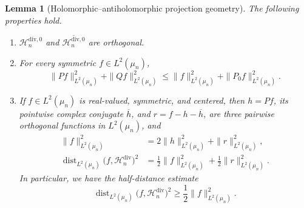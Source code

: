 \documentclass[11pt,reqno]{amsart}
\numberwithin{equation}{section}%
\numberwithin{figure}{section}%
\numberwithin{table}{section}
\theoremstyle{plain}
\newtheorem{lemma}[theorem]{Lemma}
\theoremstyle{definition}
\begin{document}
\begin{lemma}[Holomorphic--antiholomorphic projection geometry]
  \label{le:projection-geometry}
  The following properties hold.
  \begin{enumerate}
  \item
    $\mathcal{H}_n^{\mathrm{div},0}$ and
    $\overline{\mathcal{H}_n^{\mathrm{div},0}}$ are orthogonal.
  \item For every symmetric $f\in L^2(\mu_n)$,
    \begin{equation}\label{eq:two-projection-bound}
      \|Pf\|_{L^2(\mu_n)}^2+\|Qf\|_{L^2(\mu_n)}^2
      \leq
      \|f\|_{L^2(\mu_n)}^2+\|P_0f\|_{L^2(\mu_n)}^2.
    \end{equation}
  \item If $f\in L^2(\mu_n)$ is real-valued, symmetric, and centered, then
    $h=Pf$, its pointwise complex conjugate $\overline h$, and
    $r=f-h-\overline h$, are three pairwise orthogonal functions in $L^2(\mu_n)$, and
    \begin{align}
      \|f\|_{L^2(\mu_n)}^2
      &=2\|h\|_{L^2(\mu_n)}^2+\|r\|_{L^2(\mu_n)}^2,
      \label{eq:projection-geometry-decomposition}\\
      \operatorname{dist}_{L^2(\mu_n)}
      \bigl(f,\mathcal{H}_n^{\mathrm{div}}\bigr)^2
      &=\frac{1}{2}\|f\|_{L^2(\mu_n)}^2
        +\frac{1}{2}\|r\|_{L^2(\mu_n)}^2.
      \label{eq:exact-half-distance}
    \end{align}
    In particular, we have the half-distance estimate 
    \begin{equation}\label{eq:half-distance-paper}
      \operatorname{dist}_{L^2(\mu_n)}
      \bigl(f,\mathcal{H}_n^{\mathrm{div}}\bigr)^2
      \geq\frac{1}{2}\|f\|_{L^2(\mu_n)}^2.
    \end{equation}
  \end{enumerate}
\end{lemma}
\end{document}
